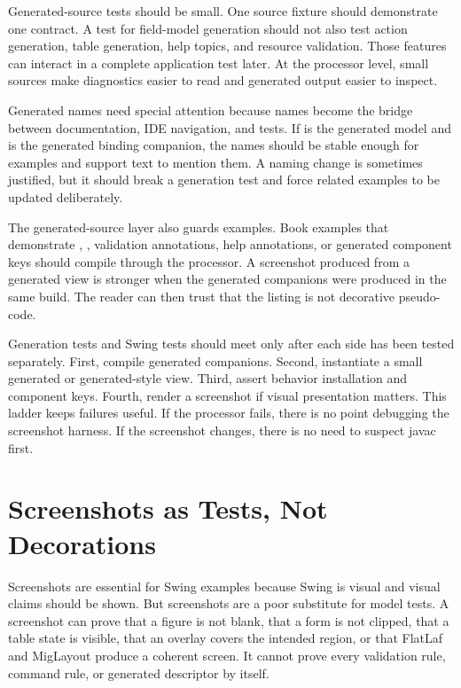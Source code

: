 Generated-source tests should be small. One source fixture should demonstrate one contract. A test for field-model generation should not also test action generation, table generation, help topics, and resource validation. Those features can interact in a complete application test later. At the processor level, small sources make diagnostics easier to read and generated output easier to inspect.

Generated names need special attention because names become the bridge between documentation, IDE navigation, and tests. If  is the generated model and  is the generated binding companion, the names should be stable enough for examples and support text to mention them. A naming change is sometimes justified, but it should break a generation test and force related examples to be updated deliberately.

The generated-source layer also guards examples. Book examples that demonstrate , , validation annotations, help annotations, or generated component keys should compile through the processor. A screenshot produced from a generated view is stronger when the generated companions were produced in the same build. The reader can then trust that the listing is not decorative pseudo-code.

Generation tests and Swing tests should meet only after each side has been tested separately. First, compile generated companions. Second, instantiate a small generated or generated-style view. Third, assert behavior installation and component keys. Fourth, render a screenshot if visual presentation matters. This ladder keeps failures useful. If the processor fails, there is no point debugging the screenshot harness. If the screenshot changes, there is no need to suspect javac first.

\section{Screenshots as Tests, Not Decorations}

Screenshots are essential for Swing examples because Swing is visual and visual claims should be shown. But screenshots are a poor substitute for model tests. A screenshot can prove that a figure is not blank, that a form is not clipped, that a table state is visible, that an overlay covers the intended region, or that FlatLaf and MigLayout produce a coherent screen. It cannot prove every validation rule, command rule, or generated descriptor by itself.

